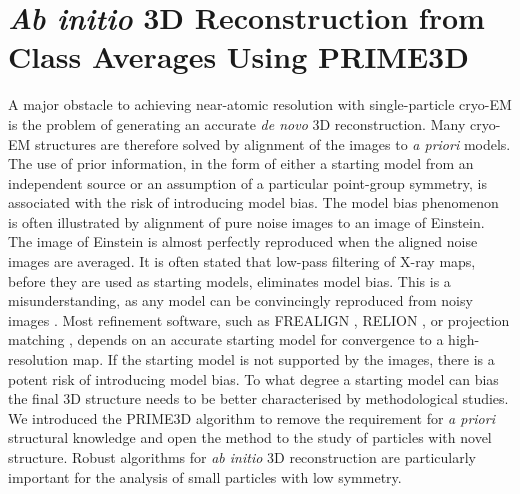 \documentclass[a4paper,11pt]{article}
\begin{document}
\section{\textit{Ab initio} 3D Reconstruction from Class Averages Using PRIME3D}
A major obstacle to achieving near-atomic resolution with single-particle cryo-EM is the problem of generating an accurate \textit{de novo} 3D reconstruction. Many cryo-EM structures are therefore solved by alignment of the images to \textit{a priori} models. The use of prior information, in the form of either a starting model from an independent source or an assumption of a particular point-group symmetry, is associated with the risk of introducing model bias. The model bias phenomenon is often illustrated by alignment of pure noise images to an image of Einstein. The image of Einstein is almost perfectly reproduced when the aligned noise images are averaged. It is often stated that low-pass filtering of X-ray maps, before they are used as starting models, eliminates model bias. This is a misunderstanding, as any model can be convincingly reproduced from noisy images \citep{henderson2013avoiding}. Most refinement software, such as FREALIGN \citep{Grigorieff:2007aa}, RELION \citep{Scheres:2012aa}, or projection matching \citep{penczek1994ribosome, Hohn:2007aa, Tang:2007aa}, depends on an accurate starting model for convergence to a high-resolution map. If the starting model is not supported by the images, there is a potent risk of introducing model bias. To what degree a starting model can bias the final 3D structure needs to be better characterised by methodological studies. We introduced the PRIME3D algorithm \citep{Elmlund:2013aa} to remove the requirement for \textit{a priori} structural knowledge and open the method to  the study of particles with novel structure. Robust algorithms for \textit{ab initio} 3D reconstruction are particularly important for the analysis of small particles with low symmetry.
\end{document}
